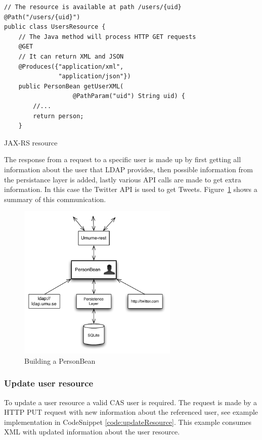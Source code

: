 \documentclass[titlepage, twocolumn, a4paper, 10pt]{article}
\begin{document}
\begin{code}
  \begin{footnotesize}
\begin{verbatim}
// The resource is available at path /users/{uid}
@Path("/users/{uid}")
public class UsersResource {
    // The Java method will process HTTP GET requests
    @GET
    // It can return XML and JSON
    @Produces({"application/xml",
               "application/json"})
    public PersonBean getUserXML(
                   @PathParam("uid") String uid) {
        //...
        return person;
    }
\end{verbatim}
  \end{footnotesize}
  \caption{JAX-RS resource}\label{code:jaxrs}
\end{code}

The response from a request to a specific user is made up by first
getting all information about the user that LDAP provides, then
possible information from the persistance layer is added, lastly
various API calls are made to get extra information. In this case the
Twitter API is used to get Tweets. Figure~\ref{fig:images/personbean}
shows a summary of this communication.

\begin{figure}[!htb]
  \centering
  \includegraphics[width=3in]{images/personbean.pdf}
  \caption{Building a PersonBean}
  \label{fig:images/personbean}
\end{figure}


\subsubsection{Update user resource}\label{sec:updateuser}
To update a user resource a valid CAS user is required. The request is
made by a HTTP PUT request with new information about the referenced
user, see example implementation in CodeSnippet
\ref{code:updateResource}. This example consumes XML with updated
information about the user resource.
\end{document}
